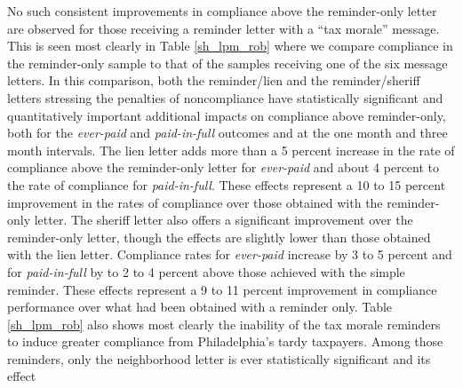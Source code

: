 \documentclass[12pt]{article}
\begin{document}
No such consistent improvements in compliance above the reminder-only letter are observed for those
receiving a reminder letter with a ``tax morale'' message.  This is
seen most clearly in Table \ref{sh_lpm_rob} where we compare
compliance in the reminder-only sample to that of the samples
receiving one of the six message letters. In this comparison, both the
reminder/lien and the reminder/sheriff letters stressing the penalties
of noncompliance have statistically significant
and quantitatively important additional impacts on compliance above reminder-only, both
for the \textit{ever-paid} and \textit{paid-in-full} outcomes and at
the one month and three month intervals. The lien letter adds more
than a 5 percent increase in the rate of compliance above the reminder-only
letter for \textit{ever-paid} and about 4 percent to the rate of
compliance for \textit{paid-in-full}. These effects represent a 10 to
15 percent improvement in the rates of compliance over those obtained
with the reminder-only letter.  The sheriff letter also offers a
significant improvement over the reminder-only letter, though the
effects are slightly lower than those obtained with the lien letter.
Compliance rates for \textit{ever-paid} increase by 3 to 5 percent and
for \textit{paid-in-full} by to 2 to 4 percent above those achieved
with the simple reminder.  These effects represent a 9 to 11 percent
improvement in compliance performance over what had been obtained with
a reminder only. Table \ref{sh_lpm_rob} also shows most clearly the
inability of the tax morale reminders to induce greater compliance
from Philadelphia's tardy taxpayers.  Among those reminders, only the
neighborhood letter is ever statistically significant and its effect
\end{document}
